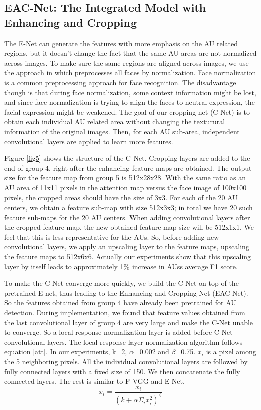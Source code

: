 \documentclass[a4paper, 10pt, conference]{ieeeconf}      %
\begin{document}
\subsection{EAC-Net: The Integrated Model with Enhancing and Cropping}
The E-Net can generate the features with more emphasis on the AU related regions, but it doesn't change the fact that the same AU areas are not normalized across images. To make sure the same regions are aligned across images, we use the approach in \cite{p22} which preprocesses all faces by normalization. Face normalization is a common preprocessing approach for face recognition. The disadvantage though is that during face normalization, some context information might be lost, and since face normalization is trying to align the faces to neutral expression, the facial expression might be weakened. The goal of our cropping net (C-Net) is to obtain each individual AU related area without changing the texturural information of the original images. Then, for each AU sub-area, independent convolutional layers are applied to learn more features.

Figure \ref{fig5} shows the structure of the C-Net. Cropping layers are added to the end of group 4, right after the enhancing feature maps are obtained. The output size for the feature map from group 5 is 512x28x28. With the same ratio as an AU area of 11x11 pixels in the attention map versus the face image of 100x100 pixels, the cropped areas should have the size of 3x3. For each of the 20 AU centers, we obtain a feature sub-map with size 512x3x3; in total we have 20 such feature sub-maps for the 20 AU centers. When adding convolutional layers after the cropped feature map, the new obtained feature map size will be 512x1x1. We feel that this is less representative for the AUs. So, before adding new convolutional layers, we apply an upscaling layer to the feature maps, upscaling the feature maps to 512x6x6. Actually our experiments show that this upscaling layer by itself leads to approximately 1\% increase in AUss average F1 score. 

To make the C-Net converge more quickly, we build the C-Net on top of the pretrained E-net, thus leading to the Enhancing and Cropping Net (EAC-Net). So the features obtained from group 4 have already been pretrained for AU detection. During implementation, we found that feature values obtained from the last convolutional layer of group 4 are very large and make the C-Net unable to converge. So a local response normalization layer is added before C-Net convolutional layers. The local response layer normalization algorithm follows equation \ref{att}. In our experiments, k=2, $\alpha$=0.002 and $\beta$=0.75. $x_{i}$ is a pixel among the 5 neighboring pixels. 
All the individual convolutional layers are followed by fully connected layers with a fixed size of 150. We then concatenate the fully connected layers. The rest is similar to F-VGG and E-Net.  
\begin{equation}
\label{att}
x_{i}=\frac{x_{i}}{(k+\alpha \Sigma _{i}x_{i}^{2})^{\beta} } 
\end{equation}
\end{document}
